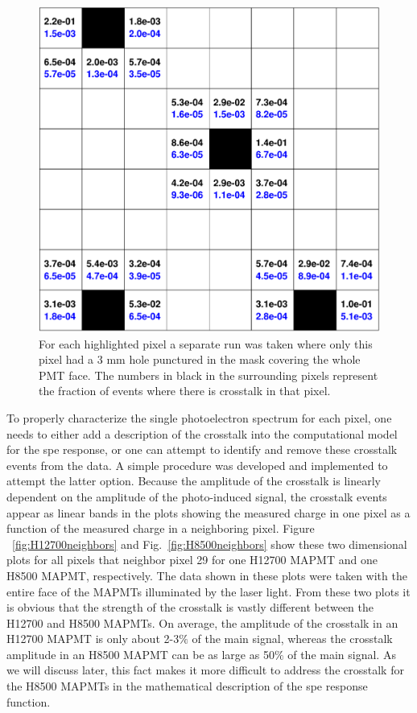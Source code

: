 \begin{figure}
	\centering
	\includegraphics[width=\linewidth]{figures/H12700_ct_ratio.png}
	\caption{For each highlighted pixel a separate run was taken where only this pixel had a 3 mm hole punctured in the mask covering the whole PMT face. The numbers in black in the surrounding pixels represent the fraction of events where there is crosstalk in that pixel.}
	\label{fig:H12700_ct_ratio}
\end{figure}

To properly characterize the single photoelectron spectrum for each pixel, one needs to either add a description of the crosstalk into the computational model for the spe response, or one can attempt to identify and remove these crosstalk events from the data. A simple procedure was developed and implemented to attempt the latter option. Because the amplitude of the crosstalk is linearly dependent on the amplitude of the photo-induced signal, the crosstalk events appear as linear bands in the plots showing the measured charge in one pixel as a function of the measured charge in a neighboring pixel. Figure ~\ref{fig:H12700neighbors} and Fig.~\ref{fig:H8500neighbors} show these two dimensional plots for all pixels that neighbor pixel 29 for one H12700 MAPMT and one H8500 MAPMT, respectively. The data shown in these plots were taken with the entire face of the MAPMTs illuminated by the laser light. From these two plots it is obvious that the strength of the crosstalk is vastly different between the H12700 and H8500 MAPMTs. On average, the amplitude of the crosstalk in an H12700 MAPMT is only about 2-3$\%$ of the main signal, whereas the crosstalk amplitude in an H8500 MAPMT can be as large as 50$\%$ of the main signal. As we will discuss later, this fact makes it more difficult to address the crosstalk for the H8500 MAPMTs in the mathematical description of the spe response function.

